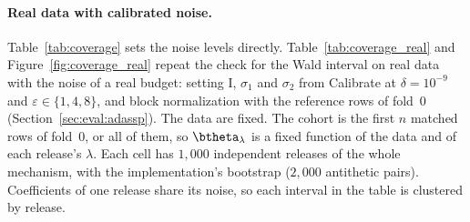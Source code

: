 \paragraph{Real data with calibrated noise.} Table~\ref{tab:coverage} sets the noise levels directly. Table~\ref{tab:coverage_real} and Figure~\ref{fig:coverage_real} repeat the check for the Wald interval on real data with the noise of a real budget: setting I, $\sigma_1$ and $\sigma_2$ from Calibrate at $\delta = 10^{-9}$ and $\varepsilon \in \{1, 4, 8\}$, and block normalization with the reference rows of fold~0 (Section~\ref{sec:eval:adassp}). The data are fixed. The cohort is the first $n$ matched rows of fold~0, or all of them, so $\btheta_\lambda$ is a fixed function of the data and of each release's $\lambda$. Each cell has $1{,}000$ independent releases of the whole mechanism, with the implementation's bootstrap ($2{,}000$ antithetic pairs). Coefficients of one release share its noise, so each interval in the table is clustered by release.
